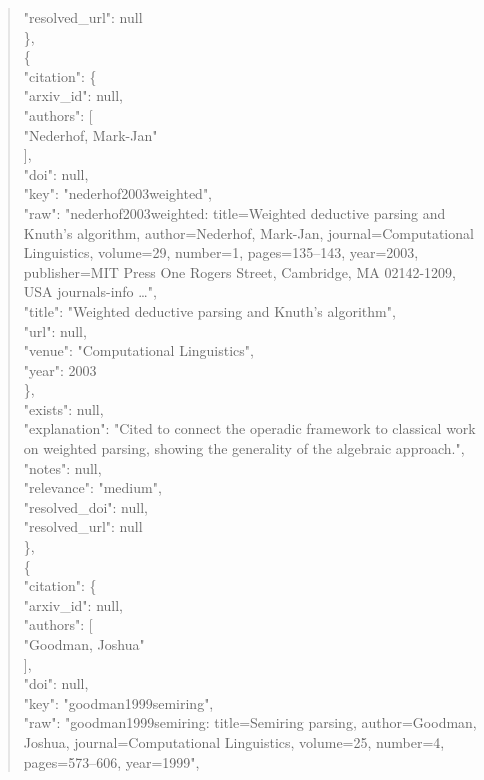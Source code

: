 \documentclass[11pt]{article}
\begin{document}
\begin{quote}
      "resolved\_url": null\\
    \},\\
    \{\\
      "citation": \{\\
        "arxiv\_id": null,\\
        "authors": [\\
          "Nederhof, Mark-Jan"\\
        ],\\
        "doi": null,\\
        "key": "nederhof2003weighted",\\
        "raw": "nederhof2003weighted: title=Weighted deductive parsing and Knuth's algorithm, author=Nederhof, Mark-Jan, journal=Computational Linguistics, volume=29, number=1, pages=135--143, year=2003, publisher=MIT Press One Rogers Street, Cambridge, MA 02142-1209, USA journals-info …",\\
        "title": "Weighted deductive parsing and Knuth's algorithm",\\
        "url": null,\\
        "venue": "Computational Linguistics",\\
        "year": 2003\\
      \},\\
      "exists": null,\\
      "explanation": "Cited to connect the operadic framework to classical work on weighted parsing, showing the generality of the algebraic approach.",\\
      "notes": null,\\
      "relevance": "medium",\\
      "resolved\_doi": null,\\
      "resolved\_url": null\\
    \},\\
    \{\\
      "citation": \{\\
        "arxiv\_id": null,\\
        "authors": [\\
          "Goodman, Joshua"\\
        ],\\
        "doi": null,\\
        "key": "goodman1999semiring",\\
        "raw": "goodman1999semiring: title=Semiring parsing, author=Goodman, Joshua, journal=Computational Linguistics, volume=25, number=4, pages=573--606, year=1999",\\

\end{quote}
\end{document}
